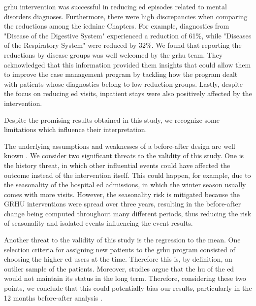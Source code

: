 \documentclass{bmcart}
\begin{document}
\par \gls{grhu} intervention was successful in reducing \gls{ed} episodes related to mental disorders diagnoses.
Furthermore, there were high discrepancies when comparing the reductions among the \gls{icdnine} Chapters. 
For example, diagnostics from "Disease of the Digestive System" experienced a reduction of 61\%, while "Diseases of the Respiratory System" were reduced by 32\%.
We found that reporting the reductions by disease groups was well welcomed by the \gls{grhu} team. 
They acknowledged that this information provided them insights that could allow them to improve the case management program by tackling how the program dealt with patients whose diagnostics belong to low reduction groups.
Lastly, despite the focus on reducing \gls{ed} visits, inpatient stays were also positively affected by the intervention.
\par Despite the promising results obtained in this study, we recognize some limitations which influence their interpretation. 
\par The underlying assumptions and weaknesses of a before-after design are well known \cite[Chapter~3]{noauthor_guide_2020}.
We consider two significant threats to the validity of this study.
One is the history threat, in which other influential events could have affected the outcome instead of the intervention itself. 
This could happen, for example, due to the seasonality of the hospital \gls{ed} admissions, in which the winter season usually comes with more visits. 
However, the seasonality risk is mitigated because the GRHU interventions were spread over three years, resulting in the before-after change being computed throughout many different periods, thus reducing the risk of seasonality and isolated events influencing the event results.
\par Another threat to the validity of this study is the regression to the mean.
One selection criteria for assigning new patients to the \gls{grhu} program consisted of choosing the higher \gls{ed} users at the time.
Therefore this is, by definition, an outlier sample of the patients.
Moreover, studies argue that the \gls{hu} of the \gls{ed} would not maintain its status in the long term.
Therefore, considering these two points, we conclude that this could potentially bias our results, particularly in the 12 months before-after analysis \cite{lacalle_frequent_2010}. 
\end{document}
